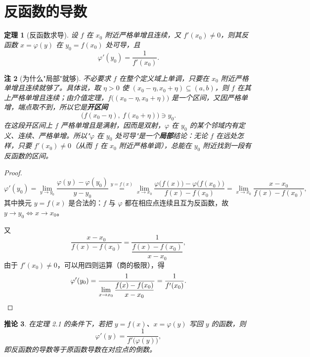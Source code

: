 \documentclass[UTF8,11pt]{ctexart}
\theoremstyle{cnthm}
\newtheorem{thm}{定理}[section]
\newtheorem{cor}[thm]{推论}
\newtheorem{rem}[thm]{注}
\begin{document}
\section{反函数的导数}

\begin{thm}[反函数求导]
设 $f$ 在 $x_0$ 附近严格单增且连续，又 $f'(x_0)\neq0$，则其反函数 $x=\varphi(y)$ 在 $y_0=f(x_0)$ 处可导，且
\[
\varphi'(y_0)=\frac{1}{f'(x_0)} .
\]
\end{thm}

\begin{rem}[为什么"局部"就够]
不必要求 $f$ 在整个定义域上单调，只要在 $x_0$ 附近严格单增且连续就够了。具体说，取 $\eta>0$ 使 $(x_0-\eta,x_0+\eta)\subseteq(a,b)$，则 $f$ 在其上严格单增且连续；由介值定理，$f\bigl((x_0-\eta,x_0+\eta)\bigr)$ 是一个区间，又因严格单增，端点取不到，所以它是\textbf{开区间}
\[
\bigl(f(x_0-\eta),\ f(x_0+\eta)\bigr)\ni y_0 .
\]
在这段开区间上 $f$ 严格单增且是满射，因而是双射，$\varphi$ 在 $y_0$ 的某个邻域内有定义、连续、严格单增。所以"$\varphi$ 在 $y_0$ 处可导"是一个\textbf{局部}结论：无论 $f$ 在远处怎样，只要 $f'(x_0)\neq0$（从而 $f$ 在 $x_0$ 附近严格单调），总能在 $y_0$ 附近找到一段有反函数的区间。
\end{rem}

\begin{proof}
\[
\varphi'(y_0)=\lim_{y\to y_0}\frac{\varphi(y)-\varphi(y_0)}{y-y_0}
\overset{y=f(x)}{=}
\lim_{x\to x_0}\frac{\varphi\bigl(f(x)\bigr)-\varphi\bigl(f(x_0)\bigr)}{f(x)-f(x_0)}
=\lim_{x\to x_0}\frac{x-x_0}{f(x)-f(x_0)} ,
\]
其中换元 $y=f(x)$ 是合法的：$f$ 与 $\varphi$ 都在相应点连续且互为反函数，故 $y\to y_0\iff x\to x_0$。

又
\[
\frac{x-x_0}{f(x)-f(x_0)}=\frac{1}{\dfrac{f(x)-f(x_0)}{x-x_0}} ,
\]
由于 $f'(x_0)\neq0$，可以用四则运算（商的极限），得
\[
\varphi'(y_0)=\frac{1}{\lim\limits_{x\to x_0}\dfrac{f(x)-f(x_0)}{x-x_0}}=\frac{1}{f'(x_0)} . \qedhere
\]
\end{proof}

\begin{cor}
在定理 2.1 的条件下，若把 $y=f(x)$、$x=\varphi(y)$ 写回 $y$ 的函数，则
\[
\varphi'(y)=\frac{1}{f'\bigl(\varphi(y)\bigr)} ,
\]
即反函数的导数等于原函数导数在对应点的倒数。
\end{cor}
\end{document}
